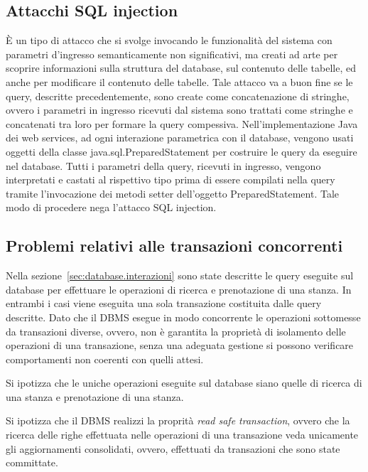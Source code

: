 \documentclass[a4paper]{article}
\begin{document}
\subsection{Attacchi SQL injection}
\`E un tipo di attacco che si svolge invocando le funzionalit\`a del
sistema con parametri d'ingresso semanticamente non significativi, ma
creati ad arte per scoprire informazioni sulla struttura del database,
sul contenuto delle tabelle, ed anche per modificare il contenuto
delle tabelle. Tale attacco va a buon fine se le query, descritte
precedentemente, sono create come concatenazione di stringhe, ovvero i
parametri in ingresso ricevuti dal sistema sono trattati come stringhe
e concatenati tra loro per formare la query
compessiva. Nell'implementazione Java dei web services, ad ogni
interazione parametrica con il database, vengono usati oggetti della
classe java.sql.PreparedStatement per costruire le query da eseguire
nel database. Tutti i parametri della query, ricevuti in
ingresso, vengono interpretati e castati al rispettivo tipo prima di
essere compilati nella query tramite l'invocazione dei metodi setter
dell'oggetto PreparedStatement. Tale modo di procedere nega l'attacco
SQL injection.

\subsection{Problemi relativi alle transazioni concorrenti}
Nella sezione~\ref{sec:database.interazioni} sono state descritte le
query eseguite sul database per effettuare le operazioni di ricerca e
prenotazione di una stanza. In entrambi i casi viene eseguita una sola
transazione costituita dalle query descritte. Dato che il DBMS esegue
in modo concorrente le operazioni sottomesse da transazioni diverse,
ovvero, non \`e garantita la propriet\`a di isolamento delle
operazioni di una transazione, senza una adeguata gestione si possono
verificare comportamenti non coerenti con quelli attesi.

Si ipotizza che le uniche operazioni eseguite sul database siano
quelle di ricerca di una stanza e prenotazione di una stanza.

Si ipotizza che il DBMS realizzi la proprit\`a \emph{read safe
  transaction}, ovvero che la ricerca delle righe effettuata nelle
operazioni di una transazione veda unicamente gli aggiornamenti
consolidati, ovvero, effettuati da transazioni che sono state
committate.
\end{document}
